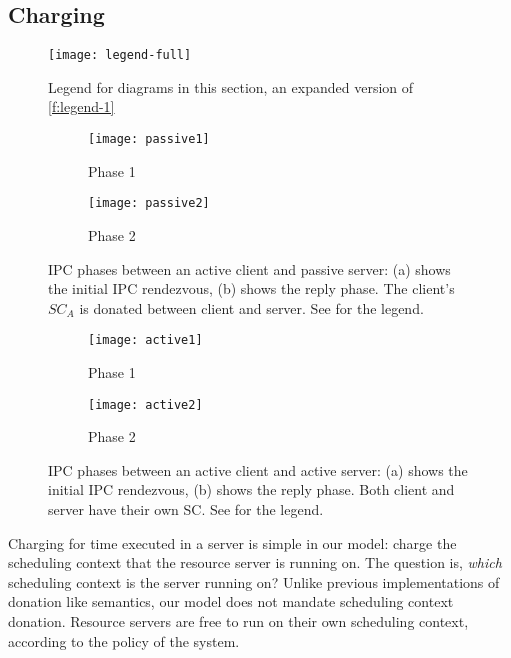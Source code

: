 \subsection{Charging}

\begin{figure}
    \centering
    \texttt{[image: legend-full]}
    \caption{Legend for diagrams in this section, an expanded version of \cref{f:legend-1}}
    \label{f:legend-2}
\end{figure}


\begin{figure}
    \centering
    \begin{subfigure}[h]{0.48\textwidth}
        \centering
        \texttt{[image: passive1]}
        \caption{Phase 1}
        \label{f:passive1}
    \end{subfigure}%
    \begin{subfigure}[h]{0.48\textwidth}
        \centering
        \texttt{[image: passive2]}
        \caption{Phase 2}
        \label{f:passive2}
    \end{subfigure}
    \caption{IPC phases between an active client and passive server: (a) shows the initial IPC rendezvous, (b) shows the
    reply phase. The client's $SC_{A}$ is donated between client and server. See  for the legend.}
    \label{f:passive}
\end{figure}
\begin{figure}
\centering
\begin{subfigure}[h]{0.48\textwidth}
    \centering
    \texttt{[image: active1]}
    \caption{Phase 1}
    \label{f:active1}
\end{subfigure}%
\begin{subfigure}[h]{0.48\textwidth}
    \centering
    \texttt{[image: active2]}
    \caption{Phase 2}
    \label{f:active2}
\end{subfigure}
\caption{IPC phases between an active client and active server: (a) shows the initial IPC rendezvous, (b) shows the
reply phase. Both client and server have their own SC. See  for the legend.}
\label{f:active}
\end{figure}

Charging for time executed in a server is simple in our model: charge the scheduling
context that the resource server is running on.
The question is, \emph{which} scheduling context is the server running on? Unlike
previous implementations of donation like semantics, our model does not mandate
scheduling context donation. Resource servers are free to run on their own scheduling context, 
according to the policy of the system.

